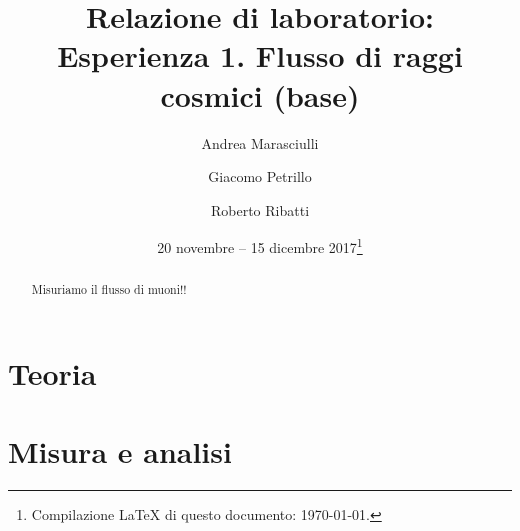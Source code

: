 \documentclass[a4paper]{article}
\title{Relazione di laboratorio:\\
Esperienza 1. Flusso di raggi cosmici (base)}
\author{Andrea Marasciulli
\and Giacomo Petrillo
\and Roberto Ribatti}
\date{20 novembre -- 15 dicembre 2017\footnote{Compilazione \LaTeX{} di questo documento: \today.}}
\begin{document}
\maketitle

\begin{abstract}
	Misuriamo il flusso di muoni!!
\end{abstract}

\tableofcontents

\newpage



\section{Teoria}







\section{Misura e analisi}














\end{document}

